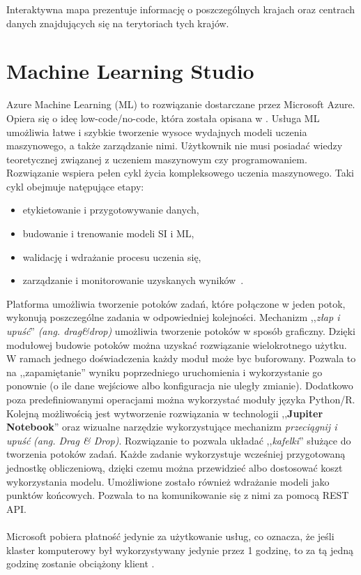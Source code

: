 Interaktywna mapa prezentuje informację o poszczególnych krajach oraz centrach danych znajdujących się na terytoriach tych krajów.

\section{Machine Learning Studio}
Azure Machine Learning (ML) to rozwiązanie dostarczane przez Microsoft Azure. Opiera się o ideę low-code/no-code, która została opisana w . Usługa ML umożliwia łatwe i szybkie tworzenie wysoce wydajnych modeli uczenia maszynowego, a także zarządzanie nimi. Użytkownik nie musi posiadać wiedzy teoretycznej związanej z uczeniem maszynowym czy programowaniem. Rozwiązanie wspiera pełen cykl życia kompleksowego uczenia maszynowego. Taki cykl obejmuje natępujące etapy:
\begin{itemize}
    \item etykietowanie i przygotowywanie danych,
    \item budowanie i trenowanie modeli SI i ML,
    \item walidację i wdrażanie procesu uczenia się,
    \item zarządzanie i monitorowanie uzyskanych wyników~\cite{MicrosoftAzurel}.
\end{itemize}


Platforma umożliwia tworzenie potoków zadań, które połączone w jeden potok, wykonują poszczególne zadania w odpowiedniej kolejności. Mechanizm ,,\textit{złap i upuść}'' \textit{(ang. drag\&drop)} umożliwia tworzenie potoków w sposób graficzny. Dzięki modułowej budowie potoków można uzyskać rozwiązanie wielokrotnego użytku. W ramach jednego doświadczenia każdy moduł może byc buforowany. Pozwala to na ,,zapamiętanie'' wyniku poprzedniego uruchomienia i wykorzystanie go ponownie (o ile dane wejściowe albo konfiguracja nie uległy zmianie). Dodatkowo poza predefiniowanymi operacjami można wykorzystać moduły języka Python/R. Kolejną możliwością jest wytworzenie rozwiązania w technologii ,,\textbf{Jupiter Notebook}'' oraz wizualne narzędzie wykorzystujące mechanizm \textit{przeciągnij i upuść} \textit{(ang. Drag \& Drop)}. Rozwiązanie to pozwala układać ,,\textit{kafelki}'' służące do tworzenia potoków zadań. Każde zadanie wykorzystuje wcześniej przygotowaną jednostkę obliczeniową, dzięki czemu można przewidzieć albo dostosować koszt wykorzystania modelu. Umożliwione zostało również wdrażanie modeli jako punktów końcowych. Pozwala to na komunikowanie się z nimi za pomocą REST API.
\\ \\
Microsoft pobiera płatność jedynie za użytkowanie usług, co oznacza, że jeśli klaster komputerowy był wykorzystywany jedynie przez 1 godzinę, to za tą jedną godzinę zostanie obciążony klient \cite{MicrosoftAzuref}.
